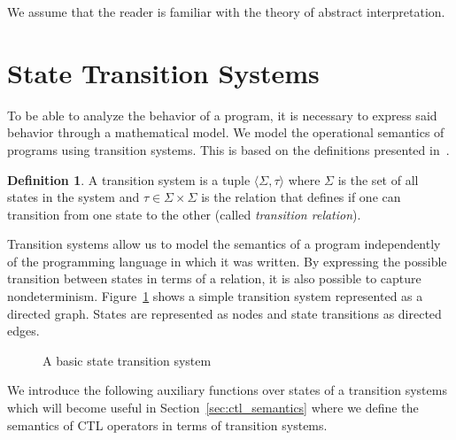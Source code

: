 \documentclass[11pt,a4paper,titlepage]{article}
\theoremstyle{definition}
\newtheorem{definition}{Definition}[section]
\begin{document}
We assume that the reader is familiar with the theory of abstract interpretation. 

\section{State Transition Systems}\label{sec:state_transition_system}

To be able to analyze the behavior of a program, it is necessary 
to express said behavior through a mathematical model. 
We model the operational semantics of programs using transition systems. 
This is based on the definitions presented in~\cite{UrbanM-VMCAI15}.

\begin{definition}
    A transition system is a tuple $\langle \Sigma, \tau \rangle$ where $\Sigma$ 
    is the set of all states in the system and $\tau \in \Sigma \times \Sigma$ 
    is the relation that defines if one can transition from one state to the other (called \emph{transition relation}).
\end{definition}

Transition systems allow us to model the semantics of a program 
independently of the programming language in which it was written. 
By expressing the possible transition between states in terms of a relation, 
it is also possible to capture nondeterminism. Figure~\ref{fig:basic_transition_system} 
shows a simple transition system represented as a directed graph. States are represented as nodes
and state transitions as directed edges.
\\

\begin{figure}
\centering
{}
\caption{A basic state transition system} 
\label{fig:basic_transition_system}
\end{figure}


We introduce the following auxiliary functions over states of a transition systems which will become 
useful in Section~\ref{sec:ctl_semantics} where we define the semantics of CTL operators in terms of transition systems.
\end{document}
